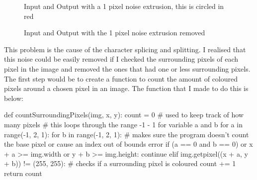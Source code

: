 \documentclass{report}
\begin{document}
\begin{figure}[H]
    \centering
    \caption{Input and Output with a 1 pixel noise extrusion, this is circled in red}
    \label{fig:Crop Out Character Noise Test 1}
\end{figure}
\begin{figure}[H]
    \centering
    \caption{Input and Output with the 1 pixel noise extrusion removed}
    \label{fig:Crop Out Character Noise Test 1}
\end{figure}
\noindent This problem is the cause of the character splicing and splitting. I realised that this noise could be easily removed if I checked the surrounding pixels of each pixel in the image and removed the ones that had one or less surrounding pixels. The first step would be to create a function to count the amount of coloured pixels around a chosen pixel in an image. The function that I made to do this is below:
\begin{python}
def countSurroundingPixels(img, x, y):
    count = 0  # used to keep track of how many pixels
    # this loops through the range -1 - 1 for variable a and b
    for a in range(-1, 2, 1):
        for b in range(-1, 2, 1):
            # makes sure the program doesn't count the base pixel or cause an index out of bounds error
            if (a == 0 and b == 0) or x + a >= img.width or y + b >= img.height:
                continue
            elif img.getpixel((x + a, y + b)) != (255, 255):  # checks if a surrounding pixel is coloured
                count += 1
    return count
\end{python}
\end{document}
